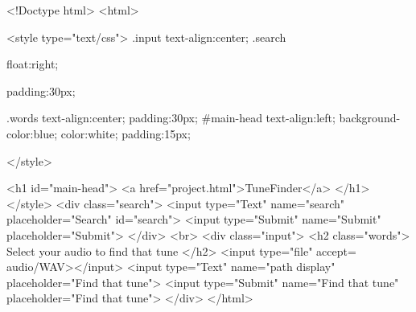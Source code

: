 <!Doctype html>
<html>

<style type="text/css">
	.input{
	text-align:center;
	}
	.search{
	float:right;

	padding:30px;
	}
	.words{
	text-align:center;
	padding:30px;
	}
	#main-head{
	text-align:left;
	background-color:blue;
	color:white;
	padding:15px;
	}

	</style>

<h1 id="main-head">
<a href="\Users{}\Documents\Senior project\homepage.html">TuneFinder</a>
</h1>
	</style>
	<div class="search">
<input type="Text" name="search" placeholder="Search" id="search">
<input type="Submit" name="Submit" placeholder="Submit">
</div>
<br>
<div class="input">
<h2 class="words">
Select your audio to find that tune 
</h2>
<input type="file" accept= audio/WAV></input>
<input type="Text" name="path display" placeholder="Find that tune">
<input type="Submit" name="Find that tune" placeholder="Find that tune">
</div>
</html>
